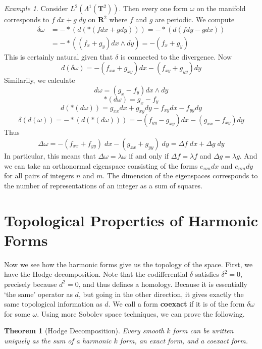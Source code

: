 \documentclass{article}
\theoremstyle{plain}
\newtheorem{theorem}{Theorem}
\theoremstyle{remark}
\newtheorem*{example}{Example}
\theoremstyle{definition}
\begin{document}
\begin{example}
    Consider $L^2(\Lambda^1(\mathbf{T}^2))$. Then every one form $\omega$ on the manifold corresponds to $f\; dx + g\; dy$ on $\mathbf{R}^2$ where $f$ and $g$ are periodic. We compute
    \begin{align*}
        \delta \omega &= - *(d(* (fdx + gdy))) = - *(d(f dy - g dx))\\
        &= - * \left( ( f_x + g_y) dx \wedge dy \right) = -(f_x + g_y)
    \end{align*}
    This is certainly natural given that $\delta$ is connected to the divergence. Now
    \[ d(\delta \omega) = - (f_{xx} + g_{xy}) dx - (f_{xy} + g_{yy}) dy \]
    Similarily, we calculate
    \[ d\omega = (g_x - f_y) dx \wedge dy \]
    \[ *(d \omega) = g_x - f_y \]
    \[ d(*(d \omega)) = g_{xx} dx + g_{xy} dy - f_{xy} dx - f_{yy} dy \]
    \[ \delta(d(\omega)) = - *(d(*(d \omega))) = - (f_{yy} - g_{xy}) dx - (g_{xx} - f_{xy}) dy \]
    Thus
    \[ \Delta \omega = - (f_{xx} + f_{yy})\; dx - (g_{xx} + g_{yy})\; dy = \Delta f\; dx + \Delta g\; dy \]
    In particular, this means that $\Delta \omega = \lambda \omega$ if and only if $\Delta f = \lambda f$ and $\Delta g = \lambda g$. And we can take an orthonormal eigenspace consisting of the forms $e_{nm} dx$ and $e_{nm} dy$ for all pairs of integers $n$ and $m$. The dimension of the eigenspaces corresponds to the number of representations of an integer as a sum of squares. 
\end{example}

\section{Topological Properties of Harmonic Forms}

Now we see how the harmonic forms give us the topology of the space. First, we have the Hodge decomposition. Note that the codifferential $\delta$ satisfies $\delta^2 = 0$, precisely because $d^2 = 0$, and thus defines a homology. Because it is essentially `the same' operator as $d$, but going in the other direction, it gives exactly the same topological information as $d$. We call a form {\bf coexact} if it is of the form $\delta \omega$ for some $\omega$. Using more Sobolev space techniques, we can prove the following.

\begin{theorem}[Hodge Decomposition]
    Every smooth $k$ form can be written uniquely as the sum of a harmonic $k$ form, an exact form, and a coexact form.
\end{theorem}
\end{document}
